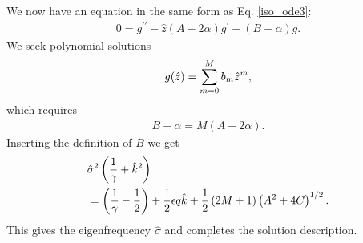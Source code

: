 We now have an equation in the same form as Eq. \ref{iso_ode3}:
\begin{align}
  0 = g^{\prime\prime} - \hat{z}\left(A - 2\alpha\right)g^\prime +
  \left(B + \alpha\right)g.
\end{align}
We seek polynomial solutions 
\begin{align}
  g(\hat{z}) = \sum_{m=0}^M b_m \hat{z}^m,
\end{align}
which requires
\begin{align}
  B + \alpha = M\left(A-2\alpha\right).\label{adia_disp0}
\end{align}
Inserting the definition of $B$ we get
\begin{align}
  &\hat{\sigma}^2\left(\frac{1}{\gamma}+\hat{k}^2\right) \notag\\ &=
  \left(\frac{1}{\gamma}-\frac{1}{2}\right) +\frac{\mathrm{i}}{2}\epsilon q
  \hat{k} + \frac{1}{2}\left(2M+1\right)\left(A^2 + 4C\right)^{1/2}\label{adia_disp}. 
\end{align}
This gives the eigenfrequency $\hat{\sigma}$ and completes the solution
description.  



